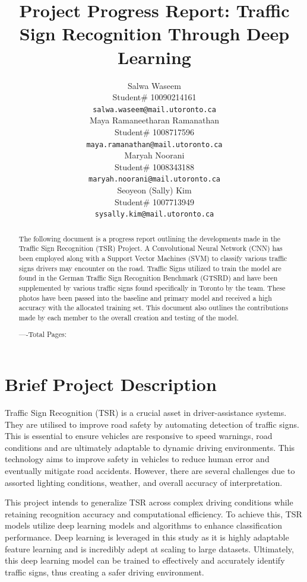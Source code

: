 \documentclass{article} %
\title{Project Progress Report: Traffic Sign Recognition Through Deep Learning}
\author{Salwa Waseem  \\
Student\# 10090214161\\
\texttt{salwa.waseem@mail.utoronto.ca} \\
\And
Maya Ramaneetharan Ramanathan  \\
Student\# 1008717596 \\
\texttt{maya.ramanathan@mail.utoronto.ca} \\
\AND
Maryah Noorani  \\
Student\# 1008343188 \\
\texttt{maryah.noorani@mail.utoronto.ca} \\
\And
Seoyeon (Sally) Kim \\
Student\# 1007713949 \\
\texttt{sysally.kim@mail.utoronto.ca} \\
\AND
}
\begin{document}
\maketitle

\begin{abstract}

The following document is a progress report outlining the developments made in the Traffic Sign Recognition (TSR) Project. A Convolutional Neural Network (CNN) has been employed along with a Support Vector Machines (SVM) to classify various traffic signs drivers may encounter on the road. Traffic Signs utilized to train the model are found in the German Traffic Sign Recognition Benchmark (GTSRD) and have been supplemented by various traffic signs found specifically in Toronto by the team. These photos have been passed into the baseline and primary model and received a high accuracy with the allocated training set. This document also outlines the contributions made by each member to the overall creation and testing of the model. 


----Total Pages: \pageref{last_page}
\end{abstract}

\section{Brief Project Description}
Traffic Sign Recognition (TSR) is a crucial asset in driver-assistance systems. They are utilised to improve road safety by automating detection of traffic signs. This is essential to ensure vehicles are responsive to speed warnings, road conditions and are ultimately adaptable to dynamic driving environments. This technology aims to improve safety in vehicles to reduce human error and eventually mitigate road accidents. However, there are several challenges due to assorted lighting conditions, weather, and overall accuracy of interpretation. 

This project intends to generalize TSR across complex driving conditions while retaining recognition accuracy and computational efficiency. To achieve this, TSR models utilize deep learning models and algorithms to enhance classification performance. Deep learning is leveraged in this study as it is highly adaptable feature learning and is incredibly adept at scaling to large datasets. Ultimately, this deep learning model can be trained to effectively and accurately identify traffic signs, thus creating a safer driving environment. 
\end{document}
